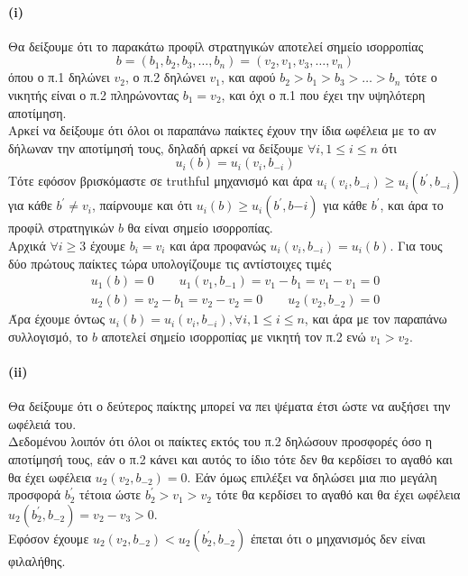 \documentclass[a4paper,11pt]{article}
\begin{document}
\paragraph{(i)} Θα δείξουμε ότι το παρακάτω προφίλ στρατηγικών αποτελεί σημείο ισορροπίας
\[b = (b_1,b_2,b_3,\dots,b_n) = (v_2,v_1,v_3,\dots,v_n)\]
όπου ο π.1 δηλώνει $v_2$, ο π.2 δηλώνει $v_1$, και αφού $b_2 > b_1 > b_3 > \dots > b_n$ τότε ο νικητής είναι ο π.2 πληρώνοντας $b_1 = v_2$, και όχι ο π.1 που έχει την υψηλότερη αποτίμηση.
\\[8pt]
Αρκεί να δείξουμε ότι όλοι οι παραπάνω παίκτες έχουν την ίδια ωφέλεια με το αν δήλωναν την αποτίμησή τους, δηλαδή αρκεί να δείξουμε $\forall i, 1 \leq i \leq n$ ότι
\[u_i(b) = u_i(v_i,b_{-i})\]
Τότε εφόσον βρισκόμαστε σε truthful μηχανισμό και άρα $u_i(v_i,b_{-i}) \geq u_i(b^\prime,b_{-i})$ για κάθε $b^\prime \neq v_i$, παίρνουμε και ότι $u_i(b) \geq u_i(b^\prime,b{-i})$ για κάθε $b^\prime$, και άρα το προφίλ στρατηγικών $b$ θα είναι σημείο ισορροπίας.
\\[8pt]
Αρχικά $\forall i \geq 3$ έχουμε $b_i=v_i$ και άρα προφανώς $u_i(v_i,b_{-i}) = u_i(b)$.
Για τους δύο πρώτους παίκτες τώρα υπολογίζουμε τις αντίστοιχες τιμές
\begin{align*}
  u_1(b) = 0 \qquad u_1(v_1,b_{-1}) = v_1 - b_1 = v_1 - v_1 = 0\\[3pt]
  u_2(b) = v_2 - b_1 = v_2 - v_2 = 0 \qquad u_2(v_2,b_{-2}) = 0
\end{align*}
Άρα έχουμε όντως $u_i(b) = u_i(v_i,b_{-i}), \forall i, 1 \leq i \leq n$, και άρα με τον παραπάνω συλλογισμό, το $b$ αποτελεί σημείο ισορροπίας με νικητή τον π.2 ενώ $v_1>v_2$.

\paragraph{(ii)} Θα δείξουμε ότι ο δεύτερος παίκτης μπορεί να πει ψέματα έτσι ώστε να αυξήσει την ωφέλειά του.
\\[8pt]
Δεδομένου λοιπόν ότι όλοι οι παίκτες εκτός του π.2 δηλώσουν προσφορές όσο η αποτίμησή τους, εάν ο π.2 κάνει και αυτός το ίδιο τότε δεν θα κερδίσει το αγαθό και θα έχει ωφέλεια $u_2(v_2,b_{-2}) = 0$.
Εάν όμως επιλέξει να δηλώσει μια πιο μεγάλη προσφορά $b_2^\prime$ τέτοια ώστε $b_2^\prime > v_1 > v_2$ τότε θα κερδίσει το αγαθό και θα έχει ωφέλεια $u_2(b_2^\prime,b_{-2}) = v_2-v_3 > 0$.
\\[8pt]
Εφόσον έχουμε $u_2(v_2,b_{-2}) < u_2(b_2^\prime,b_{-2})$ έπεται ότι ο μηχανισμός δεν είναι φιλαλήθης.
\end{document}
